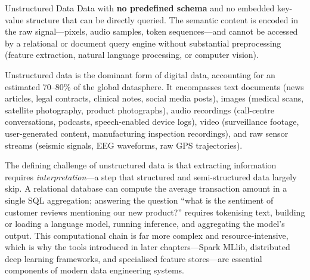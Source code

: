 \begin{defbox}{Unstructured Data}
Data with \textbf{no predefined schema} and no embedded key-value
structure that can be directly queried. The semantic content is encoded
in the raw signal---pixels, audio samples, token sequences---and cannot
be accessed by a relational or document query engine without substantial
preprocessing (feature extraction, natural language processing, or
computer vision).
\end{defbox}

Unstructured data is the dominant form of digital data, accounting for
an estimated 70--80\% of the global datasphere. It encompasses text
documents (news articles, legal contracts, clinical notes, social media
posts), images (medical scans, satellite photography, product
photographs), audio recordings (call-centre conversations, podcasts,
speech-enabled device logs), video (surveillance footage, user-generated
content, manufacturing inspection recordings), and raw sensor streams
(seismic signals, EEG waveforms, raw GPS trajectories).

The defining challenge of unstructured data is that extracting
information requires \emph{interpretation}---a step that structured and
semi-structured data largely skip. A relational database can compute the
average transaction amount in a single SQL aggregation; answering the
question ``what is the sentiment of customer reviews mentioning our new
product?'' requires tokenising text, building or loading a language
model, running inference, and aggregating the model's output. This
computational chain is far more complex and resource-intensive, which is
why the tools introduced in later chapters---Spark MLlib, distributed
deep learning frameworks, and specialised feature stores---are essential
components of modern data engineering systems.



